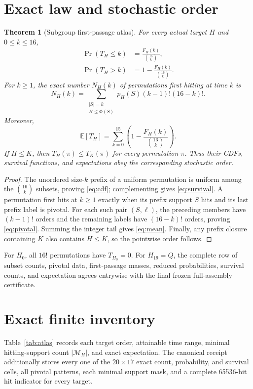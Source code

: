 \documentclass[10pt]{article}
\newtheorem{theorem}{Theorem}
\newcommand{\Phiop}{\Phi}
\newcommand{\Q}{Q}
\newcommand{\E}{\mathbb E}
\begin{document}
\section{Exact law and stochastic order}
\begin{theorem}[Subgroup first-passage atlas]
For every actual target $H$ and $0\leq k\leq16$,
\begin{align}
 \Pr(T_H\leq k)&=\frac{F_H(k)}{\binom{16}{k}},\label{eq:cdf}\\
 \Pr(T_H>k)&=1-\frac{F_H(k)}{\binom{16}{k}}.\label{eq:survival}
\end{align}
For $k\geq1$, the exact number $N_H(k)$ of permutations first hitting at
time $k$ is
\begin{equation}
 N_H(k)=\sum_{\substack{|S|=k\\H\leq\Phiop(S)}}
 p_H(S)(k-1)!(16-k)!.\label{eq:pivotal}
\end{equation}
Moreover,
\begin{equation}
 \E[T_H]=\sum_{k=0}^{15}\left(1-\frac{F_H(k)}{\binom{16}{k}}\right).
 \label{eq:mean}
\end{equation}
If $H\leq K$, then $T_H(\pi)\leq T_K(\pi)$ for every permutation $\pi$.
Thus their CDFs, survival functions, and expectations obey the corresponding
stochastic order.
\end{theorem}

\begin{proof}
The unordered size-$k$ prefix of a uniform permutation is uniform among the
$\binom{16}{k}$ subsets, proving \eqref{eq:cdf}; complementing gives
\eqref{eq:survival}.  A permutation first hits at $k\geq1$ exactly when its
prefix support $S$ hits and its last prefix label is pivotal.  For each such
pair $(S,\ell)$, the preceding members have $(k-1)!$ orders and the remaining
labels have $(16-k)!$ orders, proving \eqref{eq:pivotal}.  Summing the integer
tail gives \eqref{eq:mean}.  Finally, any prefix closure containing $K$ also
contains $H\leq K$, so the pointwise order follows.
\end{proof}

For $H_0$, all $16!$ permutations have $T_{H_0}=0$.  For $H_{19}=\Q$,
the complete row of subset counts, pivotal data, first-passage masses,
reduced probabilities, survival counts, and expectation agrees entrywise
with the final frozen full-assembly certificate.

\section{Exact finite inventory}
Table~\ref{tab:atlas} records each target order, attainable time range,
minimal hitting-support count $|\mathcal M_H|$, and exact expectation.  The
canonical receipt additionally stores every one of the $20\times17$ exact
count, probability, and survival cells, all pivotal patterns, each minimal
support mask, and a complete 65536-bit hit indicator for every target.
\end{document}
